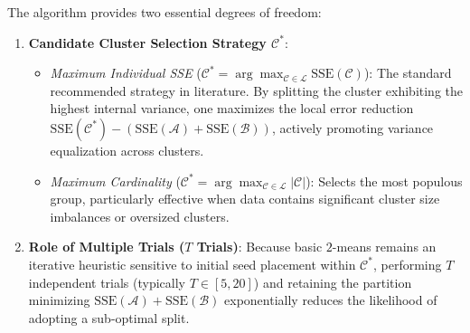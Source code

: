The algorithm provides two essential degrees of freedom:
\begin{enumerate}
    \item \textbf{Candidate Cluster Selection Strategy $\mathcal{C}^*$}:
    \begin{itemize}
        \item \textit{Maximum Individual SSE} ($\mathcal{C}^* = \arg\max_{\mathcal{C} \in \mathcal{L}} \mathrm{SSE}(\mathcal{C})$): The standard recommended strategy in literature. By splitting the cluster exhibiting the highest internal variance, one maximizes the local error reduction $\mathrm{SSE}(\mathcal{C}^*) - (\mathrm{SSE}(\mathcal{A}) + \mathrm{SSE}(\mathcal{B}))$, actively promoting variance equalization across clusters.
        \item \textit{Maximum Cardinality} ($\mathcal{C}^* = \arg\max_{\mathcal{C} \in \mathcal{L}} |\mathcal{C}|$): Selects the most populous group, particularly effective when data contains significant cluster size imbalances or oversized clusters.
    \end{itemize}
    \item \textbf{Role of Multiple Trials ($T$ Trials)}: Because basic $2$-means remains an iterative heuristic sensitive to initial seed placement within $\mathcal{C}^*$, performing $T$ independent trials (typically $T \in [5, 20]$) and retaining the partition minimizing $\mathrm{SSE}(\mathcal{A}) + \mathrm{SSE}(\mathcal{B})$ exponentially reduces the likelihood of adopting a sub-optimal split.
\end{enumerate}

